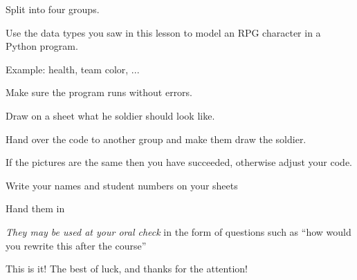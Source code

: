\documentclass{beamer}
\begin{document}
\begin{slide}{
\item Split into four groups.
\item Use the data types you saw in this lesson to model an RPG character in a Python program.
\item Example: health, team color, ...
\item Make sure the program runs without errors.
\item Draw on a sheet what he soldier should look like.
\item Hand over the code to another group and make them draw the soldier.
\item If the pictures are the same then you have succeeded, otherwise adjust your code.
}\end{slide}


\begin{slide}{
\item Write your names and student numbers on your sheets
\item Hand them in
\item \textit{They may be used at your oral check} in the form of questions such as ``how would you rewrite this after the course''
}\end{slide}


\begin{frame}{This is it!}
\center
\fontsize{18pt}{7.2}\selectfont
The best of luck, and thanks for the attention!
\end{frame}
\end{document}
